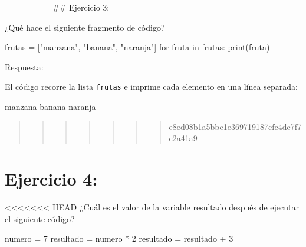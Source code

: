 \documentclass[
  a4paper,
  DIV=11,
  numbers=noendperiod,
  onepage,
  openany]{scrreprt}
\newenvironment{Shaded}{\begin{snugshade}}{\end{snugshade}}
\newcommand{\BuiltInTok}[1]{\textcolor[rgb]{0.00,0.23,0.31}{#1}}
\newcommand{\ControlFlowTok}[1]{\textcolor[rgb]{0.00,0.23,0.31}{#1}}
\newcommand{\DecValTok}[1]{\textcolor[rgb]{0.68,0.00,0.00}{#1}}
\newcommand{\KeywordTok}[1]{\textcolor[rgb]{0.00,0.23,0.31}{#1}}
\newcommand{\NormalTok}[1]{\textcolor[rgb]{0.00,0.23,0.31}{#1}}
\newcommand{\OperatorTok}[1]{\textcolor[rgb]{0.37,0.37,0.37}{#1}}
\newcommand{\StringTok}[1]{\textcolor[rgb]{0.13,0.47,0.30}{#1}}
\begin{document}
======= \#\# Ejercicio 3:

¿Qué hace el siguiente fragmento de código?

\begin{Shaded}
\begin{Highlighting}[]
\NormalTok{frutas }\OperatorTok{=}\NormalTok{ [}\StringTok{"manzana"}\NormalTok{, }\StringTok{"banana"}\NormalTok{, }\StringTok{"naranja"}\NormalTok{]}
\ControlFlowTok{for}\NormalTok{ fruta }\KeywordTok{in}\NormalTok{ frutas:}
    \BuiltInTok{print}\NormalTok{(fruta)}
\end{Highlighting}
\end{Shaded}

Respuesta:

El código recorre la lista \texttt{frutas} e imprime cada elemento en
una línea separada:

\begin{Shaded}
\begin{Highlighting}[]
\NormalTok{manzana}
\NormalTok{banana}
\NormalTok{naranja}
\end{Highlighting}
\end{Shaded}

\begin{quote}
\begin{quote}
\begin{quote}
\begin{quote}
\begin{quote}
\begin{quote}
\begin{quote}
e8ed08b1a5bbe1e369719187cfc4de7f7e2a41a9
\end{quote}
\end{quote}
\end{quote}
\end{quote}
\end{quote}
\end{quote}
\end{quote}

\hypertarget{ejercicio-4}{%
\chapter{Ejercicio 4:}\label{ejercicio-4}}

\textless\textless\textless\textless\textless\textless\textless{} HEAD
¿Cuál es el valor de la variable resultado después de ejecutar el
siguiente código?

\begin{Shaded}
\begin{Highlighting}[]
\NormalTok{numero }\OperatorTok{=} \DecValTok{7}
\NormalTok{resultado }\OperatorTok{=}\NormalTok{ numero }\OperatorTok{*} \DecValTok{2}
\NormalTok{resultado }\OperatorTok{=}\NormalTok{ resultado }\OperatorTok{+} \DecValTok{3}
\end{Highlighting}
\end{Shaded}
\end{document}
